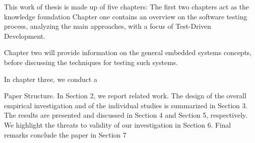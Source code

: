 This work of thesis is made up of five chapters:
The first two chapters act as the knowledge foundation 
Chapter one contains an overview on the software testing process, analyzing the main approaches, with a focus of Test-Driven Development.

Chapter two will provide information on the general embedded systems concepts, before discussing the techniques for testing such systems.

In chapter three, we conduct a 

Paper Structure. In Section 2, we report related work. The design of the
overall empirical investigation and of the individual studies is summarized in
Section 3. The results are presented and discussed in Section 4 and Section 5,
respectively. We highlight the threats to validity of our investigation in Section 6.
Final remarks conclude the paper in Section 7